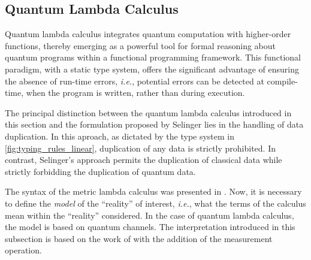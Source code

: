 


\subsection{Quantum Lambda Calculus}


Quantum lambda calculus integrates quantum computation with higher-order functions, thereby emerging as a powerful tool for formal reasoning about quantum programs within a functional programming framework. This functional paradigm, with a static type system, offers the significant advantage of ensuring the absence of run-time errors, \textit{i.e.}, potential errors can be detected at compile-time, when the program is written, rather than during execution.

The principal distinction between the quantum lambda calculus introduced in this section and the formulation proposed by Selinger \cite{selinger2006lambda,selinger2009quantum} lies in the handling of data duplication. In this aproach, as dictated by the type system in \autoref{fig:typing_rules_linear}, duplication of any data is strictly prohibited. In contrast, Selinger's approach permits the duplication of classical data while strictly forbidding the duplication of quantum data.

The syntax of the metric lambda calculus was presented in . Now, it is necessary to define the \emph{model} of the ``reality'' of interest, \textit{i.e.}, what the terms of the calculus mean within the ``reality'' considered. In the case of quantum lambda calculus, the model is based on quantum channels. The interpretation introduced in this subsection is based on the work of \cite{dahlqvist2022syntactic} with the addition of the measurement operation.


